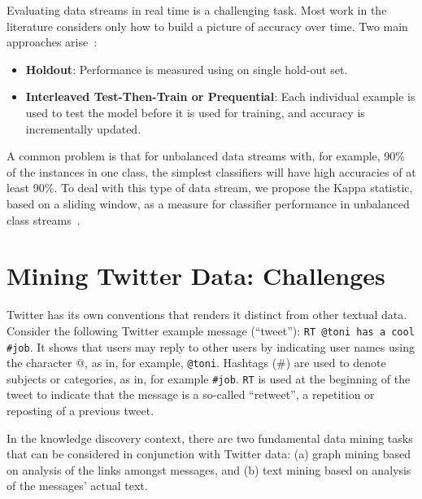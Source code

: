Evaluating data streams in real time is a challenging task.
Most work in the literature considers only how to build a picture of accuracy over time. Two main
approaches arise~\cite{MOA}:
\begin{itemize}
 \item {\bf Holdout}: Performance is measured using on single hold-out set.
\item {\bf Interleaved Test-Then-Train or Prequential}:
 Each individual example is used to test the model
before it is used for training, and accuracy is incrementally
updated. 
\end{itemize}
  
A common problem is that for unbalanced data streams with, for example, 90\% of the instances in
one class, the simplest classifiers will have high accuracies of at least 90\%. To deal with
this type of data stream,
we propose the Kappa statistic, based on a sliding window, as a measure for classifier performance
in unbalanced class streams~\cite{BifetF10}.

\section{Mining Twitter Data: Challenges}
\label{sec:challenges}

Twitter has its own conventions that renders it distinct from other
textual data. Consider the following Twitter example message
(``tweet''): \texttt{RT @toni has a cool \#job}. It shows that users
may reply to other users by indicating user names using the character
@, as in, for example, \texttt{@toni}.  Hashtags (\#) are used to
denote subjects or categories, as in, for example \texttt{\#job}.
\texttt{RT} is used at the beginning of the tweet to indicate that the
message is a so-called ``retweet'', a repetition or reposting of a
previous tweet.

In the knowledge discovery context, there are two fundamental data
mining tasks that can be considered in conjunction with Twitter data:
(a) graph mining based on analysis of the links amongst messages, and
(b) text mining based on analysis of the messages' actual text.

